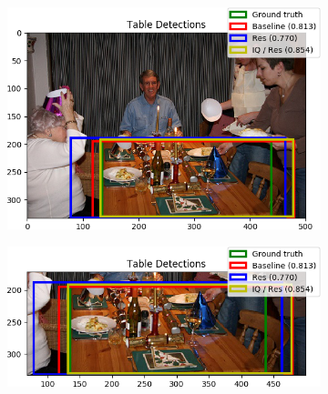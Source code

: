 \begin{figure}[H]
    \centering
    \begin{subfigure}[b]{0.45\textwidth}
        \center
        \includegraphics[width=\textwidth]{Figs/Results/000144res.png}
        \caption{}\label{fig:}
    \end{subfigure}
    \begin{subfigure}[b]{0.45\textwidth}
        \center
        \includegraphics[width=\textwidth]{Figs/Results/000144reszoom.png}
        \caption{}\label{fig:}
    \end{subfigure}
    \caption{}
    \label{fig:}
\end{figure} 